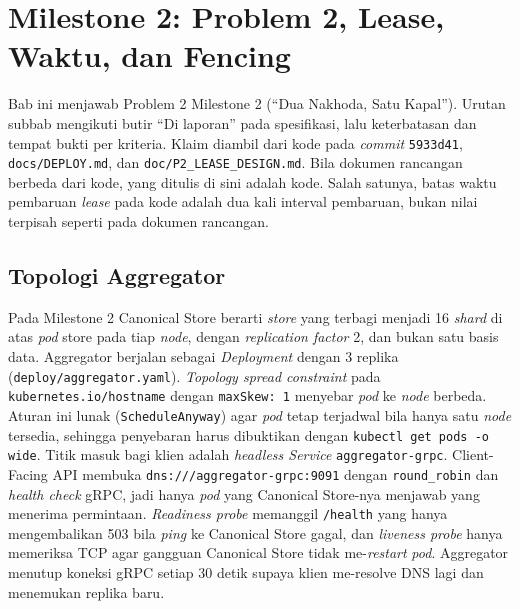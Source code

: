 \chapter[MILESTONE 2: PROBLEM 2]{Milestone 2: Problem 2, Lease, Waktu, dan Fencing}

Bab ini menjawab Problem 2 Milestone 2 (``Dua Nakhoda, Satu Kapal''). Urutan subbab mengikuti butir ``Di laporan'' pada spesifikasi, lalu keterbatasan dan tempat bukti per kriteria. Klaim diambil dari kode pada \textit{commit} \texttt{5933d41}, \texttt{docs/DEPLOY.md}, dan \texttt{doc/P2\_LEASE\_DESIGN.md}. Bila dokumen rancangan berbeda dari kode, yang ditulis di sini adalah kode. Salah satunya, batas waktu pembaruan \textit{lease} pada kode adalah dua kali interval pembaruan, bukan nilai terpisah seperti pada dokumen rancangan.

\section{Topologi Aggregator}

Pada Milestone 2 Canonical Store berarti \textit{store} yang terbagi menjadi 16 \textit{shard} di atas \textit{pod} store pada tiap \textit{node}, dengan \textit{replication factor} 2, dan bukan satu basis data. Aggregator berjalan sebagai \textit{Deployment} dengan 3 replika (\texttt{deploy/aggregator.yaml}). \textit{Topology spread constraint} pada \texttt{kubernetes.io/hostname} dengan \texttt{maxSkew: 1} menyebar \textit{pod} ke \textit{node} berbeda. Aturan ini lunak (\texttt{ScheduleAnyway}) agar \textit{pod} tetap terjadwal bila hanya satu \textit{node} tersedia, sehingga penyebaran harus dibuktikan dengan \texttt{kubectl get pods -o wide}. Titik masuk bagi klien adalah \textit{headless Service} \texttt{aggregator-grpc}. Client-Facing API membuka \texttt{dns:///aggregator-grpc:9091} dengan \texttt{round\_robin} dan \textit{health check} gRPC, jadi hanya \textit{pod} yang Canonical Store-nya menjawab yang menerima permintaan. \textit{Readiness probe} memanggil \texttt{/health} yang hanya mengembalikan 503 bila \textit{ping} ke Canonical Store gagal, dan \textit{liveness probe} hanya memeriksa TCP agar gangguan Canonical Store tidak me-\textit{restart} \textit{pod}. Aggregator menutup koneksi gRPC setiap 30 detik supaya klien me-resolve DNS lagi dan menemukan replika baru.

